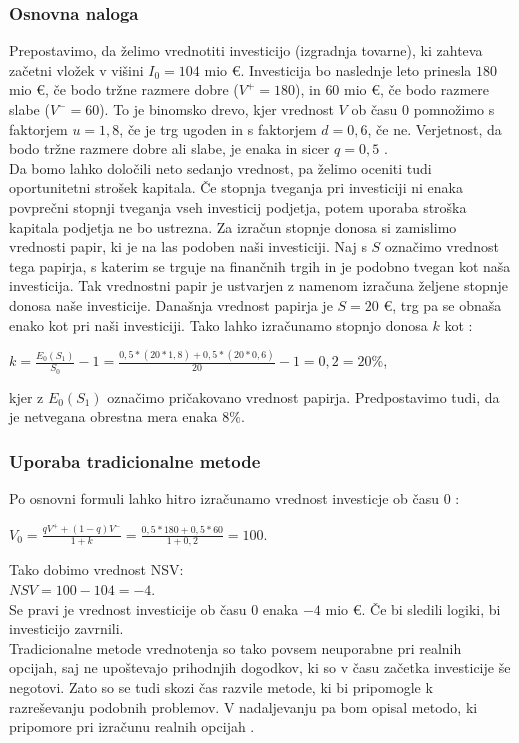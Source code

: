 \subsubsection{Osnovna naloga}
Prepostavimo, da želimo vrednotiti investicijo (izgradnja tovarne), ki zahteva začetni vložek v višini $I_0= 104$ mio €. Investicija bo naslednje leto prinesla $180$ mio €, če bodo tržne razmere dobre ($V^+=180$), in $60$ mio €, če bodo razmere slabe ($V^-=60$). To je binomsko drevo, kjer vrednost $V$ ob času 0 pomnožimo s faktorjem $u=1,8$, če je trg ugoden in s faktorjem $d=0,6$, če ne. Verjetnost, da bodo tržne razmere dobre ali slabe, je enaka in sicer $q=0,5$ \cite[str. 153]{Trigeorgis}. \\
Da bomo lahko določili neto sedanjo vrednost, pa želimo oceniti tudi oportunitetni strošek kapitala. Če stopnja tveganja pri investiciji ni enaka povprečni stopnji tveganja vseh investicij podjetja, potem uporaba stroška kapitala podjetja ne bo ustrezna. Za izračun stopnje donosa si zamislimo vrednosti papir, ki je na las podoben naši investiciji. Naj s $S$ označimo vrednost tega papirja, s katerim se trguje na finančnih trgih in je podobno tvegan kot naša investicija. Tak vrednostni papir je ustvarjen z namenom izračuna željene stopnje donosa naše investicije. Današnja vrednost papirja je $S=20$ €, trg pa se obnaša enako kot pri naši investiciji. Tako lahko izračunamo stopnjo donosa $k$ kot \cite[str. 153, 154]{Trigeorgis}:
\begin{center}
$k = \tfrac{E_0(S_1)}{S_0}-1= \tfrac{0,5 * (20*1,8)+0,5*(20*0,6)}{20}-1= 0,2 = 20 \%$,
\end{center}
kjer z $E_0(S_1)$ označimo pričakovano vrednost papirja. Predpostavimo tudi, da je netvegana obrestna mera enaka $8 \%$.\\

\subsubsection{Uporaba tradicionalne metode}
Po osnovni formuli lahko hitro izračunamo vrednost investicje ob času 0 \cite[str. 154]{Trigeorgis}:
\begin{center}
$V_0 = \tfrac{qV^+  + (1-q)V^-}{1+k}= \tfrac{0,5 * 180+0,5*60}{1+0,2}= 100$.
\end{center}
Tako dobimo vrednost NSV:\\
$NSV = 100 - 104 = -4$.\\
Se pravi je vrednost investicije ob času 0 enaka $-4$ mio €. Če bi sledili logiki, bi investicijo zavrnili.\\
Tradicionalne metode vrednotenja so tako povsem neuporabne pri realnih opcijah, saj ne upoštevajo prihodnjih dogodkov, ki so v času začetka investicije še negotovi. Zato so se tudi skozi čas razvile metode, ki bi pripomogle k razreševanju podobnih problemov. V nadaljevanju pa bom opisal metodo, ki pripomore pri izračunu realnih opcijah \cite[str. 154]{Trigeorgis}.\\

